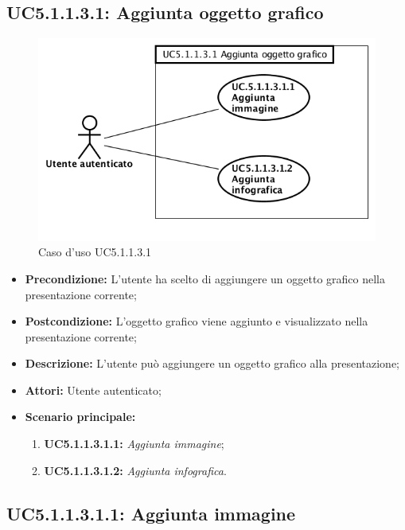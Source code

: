 \newpage
\subsection{ UC5.1.1.3.1: Aggiunta oggetto grafico}

\begin{figure}[h]
	\begin{center}
	\includegraphics[scale=0.4]{diagram/UC5-1-1-3-1.png}
	\caption{Caso d'uso UC5.1.1.3.1}
	\end{center}
\end{figure}
\begin{itemize}
	\item \textbf{Precondizione:} L'utente ha scelto di aggiungere un oggetto grafico nella presentazione corrente;
	\item \textbf{Postcondizione:} L'oggetto grafico viene aggiunto e visualizzato nella presentazione corrente;
	\item \textbf{Descrizione:} L'utente può aggiungere un oggetto grafico alla presentazione;
	\item \textbf{Attori:} Utente autenticato;
	\item \textbf{Scenario principale:}
	\begin{enumerate}
		\item \textbf{ UC5.1.1.3.1.1:} \textit{ Aggiunta immagine};
		\item \textbf{ UC5.1.1.3.1.2:} \textit{ Aggiunta infografica}.
	\end{enumerate}
\end{itemize}

\newpage
\subsection{ UC5.1.1.3.1.1: Aggiunta immagine}

